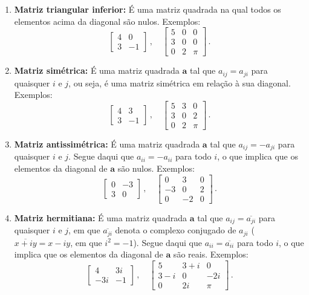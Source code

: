 \documentclass[12pt,a4paper]{report}
\newcommand{\tb}{\textbf}
\newcommand{\mb}{\mathbf}
\begin{document}
\begin{enumerate}
  \item \tb{Matriz triangular inferior:} É uma matriz quadrada na qual todos os elementos acima da diagonal são nulos. Exemplos:
  $$\begin{bmatrix}
    4&0\\
    3&-1
  \end{bmatrix}\,,\quad \begin{bmatrix}
    5&0&0\\
    3&0&0\\
    0&2&\pi
  \end{bmatrix}\,.$$
  \item \tb{Matriz simétrica:} É uma matriz quadrada $\mb{a}$ tal que $a_{ij}=a_{ji}$ para quaisquer $i$ e $j$, ou seja, é uma matriz simétrica em relação à sua diagonal. Exemplos:
  $$\begin{bmatrix}
    4&3\\
    3&-1
  \end{bmatrix}\,,\quad \begin{bmatrix}
    5&3&0\\
    3&0&2\\
    0&2&\pi
  \end{bmatrix}\,.$$
  \item \tb{Matriz antissimétrica:} É uma matriz quadrada $\mb{a}$ tal que $a_{ij}=-a_{ji}$ para quaisquer $i$ e $j$. Segue daqui que $a_{ii}=-a_{ii}$ para todo $i$, o que implica que os elementos da diagonal de $\mb a$ são nulos. Exemplos:
  $$\begin{bmatrix}
    0&-3\\
    3&0
  \end{bmatrix}\,,\quad \begin{bmatrix}
    0&3&0\\
    -3&0&2\\
    0&-2&0
  \end{bmatrix}\,.$$
  \item \tb{Matriz hermitiana:} É uma matriz quadrada $\mb a$ tal que $a_{ij}=\overline{a_{ji}}$ para quaisquer $i$ e $j$, em que $\overline{a_{ji}}$ denota o complexo conjugado de $a_{ji}$ ($\overline{x+iy}=x-iy$, em que $i^2=-1$). Segue daqui que $a_{ii}=\overline{a_{ii}}$ para todo $i$, o que implica que os elementos da diagonal de $\mb a$ são reais. Exemplos:
  $$\begin{bmatrix}
    4&3i\\
    -3i&-1
  \end{bmatrix}\,,\quad \begin{bmatrix}
    5&3+i&0\\
    3-i&0&-2i\\
    0&2i&\pi
  \end{bmatrix}\,.$$
\end{enumerate}
\end{document}
